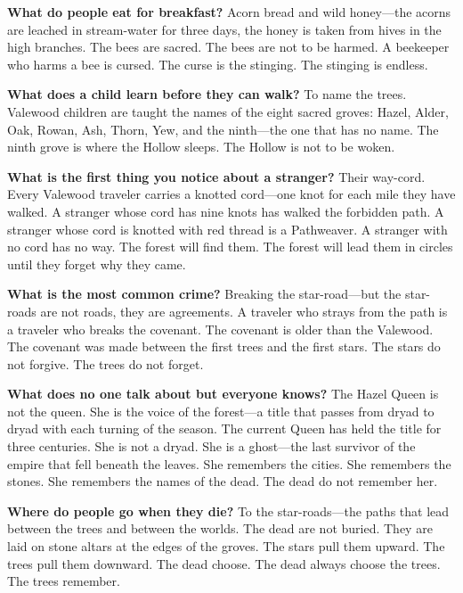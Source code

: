 \vspace{1em}

\begin{almanac}
\textbf{What do people eat for breakfast?} Acorn bread and wild honey---the acorns are leached in stream-water for three days, the honey is taken from hives in the high branches. The bees are sacred. The bees are not to be harmed. A beekeeper who harms a bee is cursed. The curse is the stinging. The stinging is endless.

\textbf{What does a child learn before they can walk?} To name the trees. Valewood children are taught the names of the eight sacred groves: Hazel, Alder, Oak, Rowan, Ash, Thorn, Yew, and the ninth---the one that has no name. The ninth grove is where the Hollow sleeps. The Hollow is not to be woken.

\textbf{What is the first thing you notice about a stranger?} Their way-cord. Every Valewood traveler carries a knotted cord---one knot for each mile they have walked. A stranger whose cord has nine knots has walked the forbidden path. A stranger whose cord is knotted with red thread is a Pathweaver. A stranger with no cord has no way. The forest will find them. The forest will lead them in circles until they forget why they came.

\textbf{What is the most common crime?} Breaking the star-road---but the star-roads are not roads, they are agreements. A traveler who strays from the path is a traveler who breaks the covenant. The covenant is older than the Valewood. The covenant was made between the first trees and the first stars. The stars do not forgive. The trees do not forget.

\textbf{What does no one talk about but everyone knows?} The Hazel Queen is not the queen. She is the voice of the forest---a title that passes from dryad to dryad with each turning of the season. The current Queen has held the title for three centuries. She is not a dryad. She is a ghost---the last survivor of the empire that fell beneath the leaves. She remembers the cities. She remembers the stones. She remembers the names of the dead. The dead do not remember her.

\textbf{Where do people go when they die?} To the star-roads---the paths that lead between the trees and between the worlds. The dead are not buried. They are laid on stone altars at the edges of the groves. The stars pull them upward. The trees pull them downward. The dead choose. The dead always choose the trees. The trees remember.


\end{almanac}
